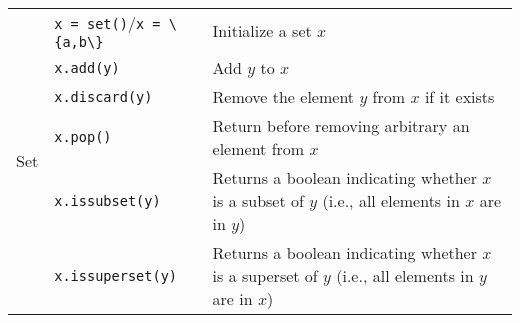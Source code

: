 \documentclass{article}
\begin{document}
\begin{center}
\begin{tabularx}{\textwidth}{llX}
\multirow{6}{*}{Set} & \lstinline|x = set()|/\lstinline|x = \{a,b\}| & Initialize a set \(x\)\\
& \lstinline|x.add(y)| & Add \(y\) to \(x\)\\
& \lstinline|x.discard(y)| & Remove the element \(y\) from \(x\) if it exists\\
& \lstinline|x.pop()| & Return before removing arbitrary an element from \(x\)\\
& \lstinline|x.issubset(y)| & Returns a boolean indicating whether \(x\) is a subset of \(y\) (i.e., all elements in \(x\) are in \(y\))\\
& \lstinline|x.issuperset(y)| & Returns a boolean indicating whether \(x\) is a superset of \(y\) (i.e., all elements in \(y\) are in \(x\))\\
\bottomrule\end{tabularx}\end{center}
\end{document}
